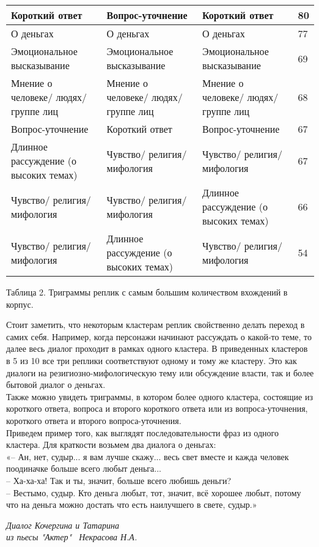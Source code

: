 \documentclass[a4paper,14pt]{article}
\begin{document}
\begin{justify}
\begin{center}
\begin{tabularx}{\linewidth}{ | E | E | E | E | }
Короткий ответ&Вопрос-уточнение&Короткий ответ&80\\\hline
О деньгах&О деньгах&О деньгах&77\\\hline
Эмоциональное высказывание&Эмоциональное высказывание&Эмоциональное высказывание&69\\\hline
Мнение о человеке/ людях/ группе лиц&Мнение о человеке/ людях/ группе лиц&Мнение о человеке/ людях/ группе лиц&68\\\hline
Вопрос-уточнение&Короткий ответ&Вопрос-уточнение&67\\\hline
Длинное рассуждение (о высоких темах)&Чувство/ религия/ мифология&Чувство/ религия/ мифология&67\\\hline
Чувство/ религия/ мифология&Чувство/ религия/ мифология&Длинное рассуждение (о высоких темах)&66\\\hline
Чувство/ религия/ мифология&Длинное рассуждение (о высоких темах)&Чувство/ религия/ мифология&54\\\hline
\end{tabularx}
Таблица 2. Триграммы реплик с самым большим количеством вхождений в корпус.
\end{center}
\indent
Стоит заметить, что некоторым кластерам реплик свойственно делать переход в самих себя. Например, когда персонажи начинают рассуждать о какой-то теме, то далее весь диалог проходит в рамках одного кластера. В приведенных кластеров в 5 из 10 все три реплики соответствуют одному и тому же кластеру. Это как диалоги на резигиозно-мифологическую тему или обсуждение власти, так и более бытовой диалог о деньгах.\\
\indent
Также можно увидеть триграммы, в котором более одного кластера, состоящие из короткого ответа, вопроса и второго короткого ответа или из вопроса-уточнения, короткого ответа и второго вопроса-уточнения.\\ 
\indent
Приведем пример того, как выглядят последовательности фраз из одного кластера. Для краткости возьмем два диалога о деньгах:\\
\indent
«-- Ан, нет, судыр... я вам лучше скажу... весь свет вместе и кажда человек поодиначке больше всего любыт деньга... \\
\indent
-- Ха-ха-ха! Так и ты, значит, больше всего любишь деньги? \\
\indent
-- Вестымо, судыр. Кто деньга любыт, тот, значит, всё хорошее любыт, потому что на деньга можно достать что есть наилучшего в свете, судыр.»
\begin{flushright}\textit{Диалог Кочергина и Татарина\\из пьесы "Актер" \ Некрасова Н.А.}\end{flushright}

\end{justify}
\end{document}
